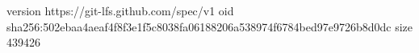 version https://git-lfs.github.com/spec/v1
oid sha256:502ebaa4aeaf4f8f3e1f5c8038fa06188206a538974f6784bed97e9726b8d0dc
size 439426
